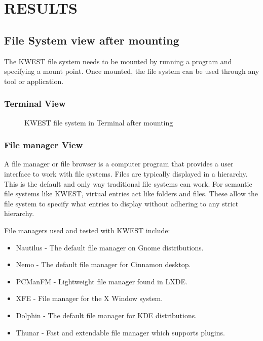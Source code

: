 \chapter {RESULTS}

\section{File System view after mounting}
The KWEST file system needs to be mounted by running a program and specifying a mount point. Once mounted, the file system can be used through any tool or application.
\subsection{Terminal View}
\begin{figure}[htb]
\centering
\setlength\fboxsep{0pt}
\setlength\fboxrule{0.5pt}
\caption{KWEST file system in Terminal after mounting}
\label{fig:dfd0}
\end{figure}

\subsection{File manager View}
A file manager or file browser is a computer program that provides a user interface to work with file systems. Files are typically displayed in a hierarchy. This is the default and only way traditional file systems can work. For semantic file systems like KWEST, virtual entries act like folders and files. These allow the file system to specify what entries to display without adhering to any strict hierarchy.

File managers used and tested with KWEST include: 
\begin{itemize}
\item Nautilus - The default file manager on Gnome distributions.
\item Nemo - The default file manager for Cinnamon desktop.
\item PCManFM - Lightweight file manager found in LXDE.
\item XFE - File manager for the X Window system.
\item Dolphin - The default file manager for KDE distributions.
\item Thunar - Fast and extendable file manager which supports plugins.
\end{itemize}

